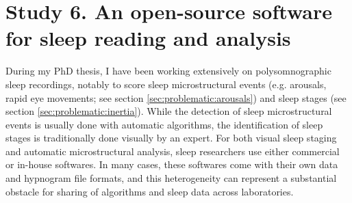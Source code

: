 \section{Study 6. An open-source software for sleep reading and analysis}
\label{sec:problematic:software}

During my PhD thesis, I have been working extensively on polysomnographic sleep recordings, notably to score sleep microstructural events (e.g. arousals, rapid eye movements; see section \ref{sec:problematic:arousals}) and sleep stages (see section \ref{sec:problematic:inertia}). While the detection of sleep microstructural events is usually done with automatic algorithms, the identification of sleep stages is traditionally done visually by an expert. For both visual sleep staging and automatic microstructural analysis, sleep researchers use either commercial or in-house softwares. In many cases, these softwares come with their own data and hypnogram file formats, and this heterogeneity can represent a substantial obstacle for sharing of algorithms and sleep data across laboratories.



